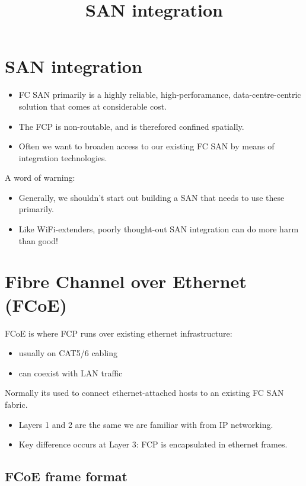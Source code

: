 \documentclass[slides]{pgnotes}
\title{SAN integration}
\begin{document}
\maketitle

\section{SAN integration}
\label{sec:san-integration}

\begin{itemize}
\item  FC SAN primarily is a highly reliable, high-perforamance, data-centre-centric solution that comes at considerable cost.
\item The FCP is non-routable, and is therefored confined spatially.
\item Often we want to broaden access to our existing FC SAN by means of integration technologies.
\end{itemize}

A word of warning:
\begin{itemize}
\item Generally, we shouldn't start out building a SAN that needs to use these primarily.
\item Like WiFi-extenders, poorly thought-out SAN integration can do more harm than good!
\end{itemize}

\section{Fibre Channel over Ethernet (FCoE)}
\label{sec:fibre-channel-over-ethernet-fcoe}

FCoE is where FCP runs over existing ethernet infrastructure:
\begin{itemize}
\item usually on CAT5/6 cabling
\item can coexist with LAN traffic
\end{itemize}
Normally its used to connect ethernet-attached hosts to an existing FC SAN fabric.
\begin{itemize}
\item Layers 1 and 2 are the same we are familiar with from IP networking.
\item Key difference occurs at Layer 3: FCP is encapsulated in ethernet frames.
\end{itemize}

\subsection{FCoE frame format}
\label{sec:fcoe-frame-format}
\end{document}
